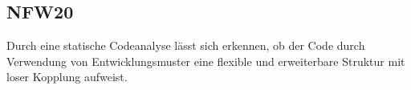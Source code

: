 \subsection*{NFW20}

Durch eine statische Codeanalyse lässt sich erkennen, ob der Code durch Verwendung von Entwicklungsmuster eine flexible und erweiterbare Struktur mit loser Kopplung aufweist.
